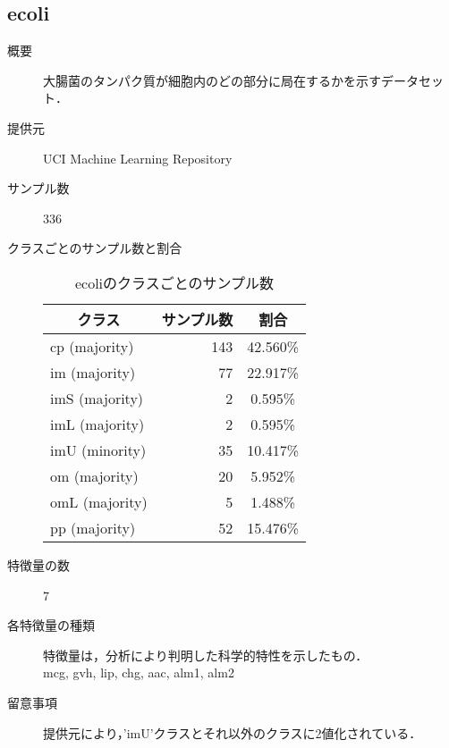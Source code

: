 \subsection{ecoli}
\begin{description}
    \item[概要] 大腸菌のタンパク質が細胞内のどの部分に局在するかを示すデータセット． \cite{ecoli}
    \item[提供元] UCI Machine Learning Repository
    \item[サンプル数] 336
    \item[クラスごとのサンプル数と割合] \mbox{}
        \begin{table}
            \centering
            \caption{ecoliのクラスごとのサンプル数}
            \label{tab:ecoli}
            \begin{tabular}{lrc} \hline
                \multicolumn{1}{c}{クラス}&
                \multicolumn{1}{c}{サンプル数}&
                \multicolumn{1}{c}{割合}\\
                \hline
                \hline
                cp (majority)& 143 & 42.560\% \\
                im (majority)& 77 & 22.917\% \\
                imS (majority)& 2 & 0.595\% \\
                imL (majority)& 2 & 0.595\% \\
                imU (minority)& 35 & 10.417\% \\
                om (majority)& 20 & 5.952\% \\
                omL (majority)& 5 & 1.488\% \\
                pp (majority)& 52 & 15.476\% \\
                \hline
            \end{tabular}
        \end{table}
    \item[特徴量の数] 7
    \item[各特徴量の種類] 特徴量は，分析により判明した科学的特性を示したもの．\\
            mcg, gvh, lip, chg, aac, alm1, alm2
    \item[留意事項] 提供元により，'imU'クラスとそれ以外のクラスに2値化されている．
\end{description}

